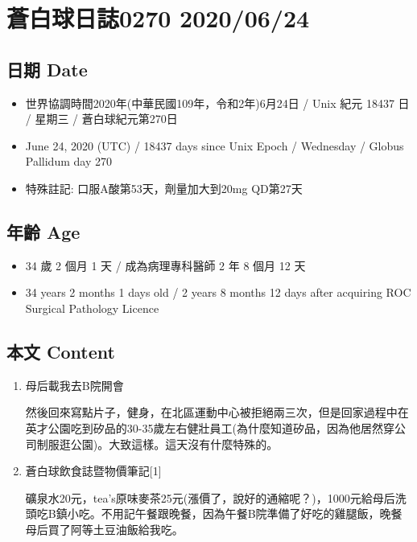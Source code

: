 \documentclass[
]{article}
\providecommand{\tightlist}{%
  \setlength{\itemsep}{0pt}\setlength{\parskip}{0pt}}
\begin{document}
\hypertarget{ux84bcux767dux7403ux65e5ux8a8c0270-20200624}{%
\section{蒼白球日誌0270
2020/06/24}\label{ux84bcux767dux7403ux65e5ux8a8c0270-20200624}}

\hypertarget{ux65e5ux671f-date-21}{%
\subsection{日期 Date}\label{ux65e5ux671f-date-21}}

\begin{itemize}
\tightlist
\item
  世界協調時間2020年(中華民國109年，令和2年)6月24日 / Unix 紀元 18437 日
  / 星期三 / 蒼白球紀元第270日
\item
  June 24, 2020 (UTC) / 18437 days since Unix Epoch / Wednesday / Globus
  Pallidum day 270
\item
  特殊註記: 口服A酸第53天，劑量加大到20mg QD第27天
\end{itemize}

\hypertarget{ux5e74ux9f61-age-21}{%
\subsection{年齡 Age}\label{ux5e74ux9f61-age-21}}

\begin{itemize}
\tightlist
\item
  34 歲 2 個月 1 天 / 成為病理專科醫師 2 年 8 個月 12 天
\item
  34 years 2 months 1 days old / 2 years 8 months 12 days after
  acquiring ROC Surgical Pathology Licence
\end{itemize}

\hypertarget{ux672cux6587-content-21}{%
\subsection{本文 Content}\label{ux672cux6587-content-21}}

\begin{enumerate}
\def\labelenumi{\arabic{enumi}.}
\item
  母后載我去B院開會

  然後回來寫點片子，健身，在北區運動中心被拒絕兩三次，但是回家過程中在英才公園吃到矽品的30-35歲左右健壯員工(為什麼知道矽品，因為他居然穿公司制服逛公園)。大致這樣。這天沒有什麼特殊的。
\item
  蒼白球飲食誌暨物價筆記{[}1{]}

  礦泉水20元，tea's原味麥茶25元(漲價了，說好的通縮呢？)，1000元給母后洗頭吃B鎮小吃。不用記午餐跟晚餐，因為午餐B院準備了好吃的雞腿飯，晚餐母后買了阿等土豆油飯給我吃。
\end{enumerate}
\end{document}
